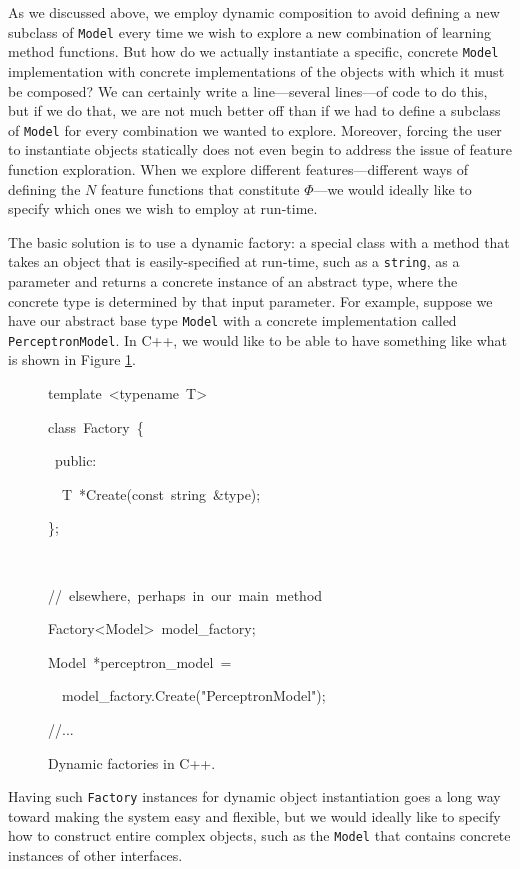 \documentclass[a4paper]{article}
\let\textquotedbl="
\newenvironment{lyxcode}
{\par\begin{list}{}{
\scriptsize
\setlength{\leftmargin}{0.1in}
\setlength{\rightmargin}{\leftmargin}
\setlength{\listparindent}{0pt}%
\raggedright
\setlength{\itemsep}{0pt}
\setlength{\parsep}{0pt}
\normalfont\ttfamily}%
 \item[]}
{\end{list}}
\begin{document}
As we discussed above, we employ dynamic composition to avoid defining
a new subclass of \texttt{Model} every time we wish to explore a new
combination of learning method functions. But how do we actually instantiate
a specific, concrete \texttt{Model} implementation with concrete implementations
of the objects with which it must be composed? We can certainly write
a line---several lines---of code to do this, but if we do that, we
are not much better off than if we had to define a subclass of \texttt{Model}
for every combination we wanted to explore. Moreover, forcing the
user to instantiate objects statically does not even begin to address
the issue of feature function exploration. When we explore different
features---different ways of defining the $N$ feature functions that
constitute $\Phi$---we would ideally like to specify which ones we
wish to employ at run-time.

The basic solution is to use a dynamic factory: a special class with
a method that takes an object that is easily-specified at run-time,
such as a \texttt{string}, as a parameter and returns a concrete instance
of an abstract type, where the concrete type is determined by that
input parameter. For example, suppose we have our abstract base type
\texttt{Model} with a concrete implementation called \texttt{PerceptronModel}.
In C++, we would like to be able to have something like what is shown
in Figure \ref{fig:dynamic-factory}. 
\begin{figure}
\begin{lyxcode}
template~<typename~T>

class~Factory~\{

~public:

~~T~{*}Create(const~string~\&type);

\};

\

//~elsewhere,~perhaps~in~our~main~method

Factory<Model>~model\_factory;

Model~{*}perceptron\_model~=

~~model\_factory.Create(\textquotedbl{}PerceptronModel\textquotedbl{});

//...
\end{lyxcode}
\caption{\label{fig:dynamic-factory}Dynamic factories in C++.}
\end{figure}
 Having such \texttt{Factory} instances for dynamic object instantiation
goes a long way toward making the system easy and flexible, but we
would ideally like to specify how to construct entire complex objects,
such as the \texttt{Model} that contains concrete instances of other
interfaces.
\end{document}
